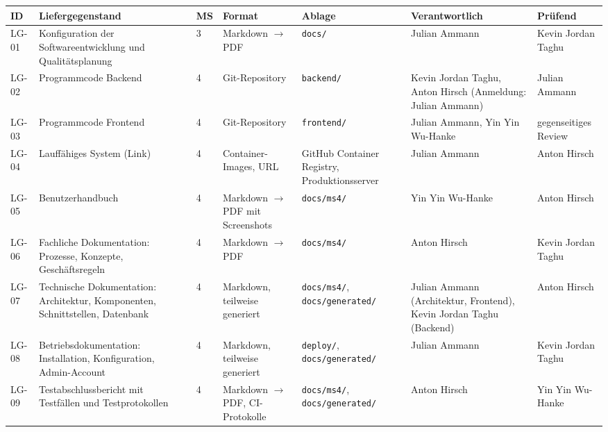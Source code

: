 \documentclass[11pt,a4paper]{article}
\begin{document}
{\small
\begin{tabularx}{\linewidth}{@{}l >{\hsize=1.45\hsize\RaggedRight\arraybackslash}X l >{\hsize=0.93\hsize\RaggedRight\arraybackslash}X >{\hsize=0.87\hsize\RaggedRight\arraybackslash}X >{\hsize=0.99\hsize\RaggedRight\arraybackslash}X >{\hsize=0.75\hsize\RaggedRight\arraybackslash}X@{}}
\toprule
\textbf{ID} & \textbf{Liefergegenstand} & \textbf{MS} & \textbf{Format} & \textbf{Ablage} & \textbf{Verantwortlich} & \textbf{Prüfend} \\
\midrule
\endhead
LG-01 & Konfiguration der Softwareentwicklung und Qualitätsplanung & 3 & Markdown $\rightarrow$ PDF & \texttt{docs/\allowbreak{}} & Julian Ammann & Kevin Jordan Taghu \\
LG-02 & Programmcode Backend & 4 & Git-Repository & \texttt{backend/\allowbreak{}} & Kevin Jordan Taghu, Anton Hirsch (Anmeldung: Julian Ammann) & Julian Ammann \\
LG-03 & Programmcode Frontend & 4 & Git-Repository & \texttt{frontend/\allowbreak{}} & Julian Ammann, Yin Yin Wu-Hanke & gegenseitiges Review \\
LG-04 & Lauffähiges System (Link) & 4 & Container-Images, URL & GitHub Container Registry, Produktionsserver & Julian Ammann & Anton Hirsch \\
LG-05 & Benutzerhandbuch & 4 & Markdown $\rightarrow$ PDF mit Screenshots & \texttt{docs/\allowbreak{}ms4/\allowbreak{}} & Yin Yin Wu-Hanke & Anton Hirsch \\
LG-06 & Fachliche Dokumentation: Prozesse, Konzepte, Geschäftsregeln & 4 & Markdown $\rightarrow$ PDF & \texttt{docs/\allowbreak{}ms4/\allowbreak{}} & Anton Hirsch & Kevin Jordan Taghu \\
LG-07 & Technische Dokumentation: Architektur, Komponenten, Schnittstellen, Datenbank & 4 & Markdown, teilweise generiert & \texttt{docs/\allowbreak{}ms4/\allowbreak{}}, \texttt{docs/\allowbreak{}generated/\allowbreak{}} & Julian Ammann (Architektur, Frontend), Kevin Jordan Taghu (Backend) & Anton Hirsch \\
LG-08 & Betriebsdokumentation: Installation, Konfiguration, Admin-Account & 4 & Markdown, teilweise generiert & \texttt{deploy/\allowbreak{}}, \texttt{docs/\allowbreak{}generated/\allowbreak{}} & Julian Ammann & Kevin Jordan Taghu \\
LG-09 & Testabschlussbericht mit Testfällen und Testprotokollen & 4 & Markdown $\rightarrow$ PDF, CI-Protokolle & \texttt{docs/\allowbreak{}ms4/\allowbreak{}}, \texttt{docs/\allowbreak{}generated/\allowbreak{}} & Anton Hirsch & Yin Yin Wu-Hanke \\

\end{tabularx}}
\end{document}
